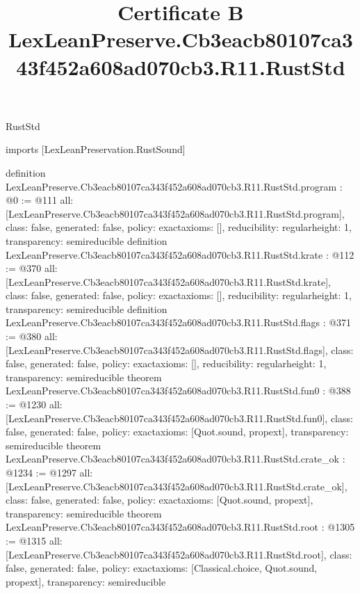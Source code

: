 \begin{lexlean}{RustStd}
\title{Certificate B LexLeanPreserve.Cb3eacb80107ca343f452a608ad070cb3.R11.RustStd}
\begin{coremodule}
imports [LexLeanPreservation.RustSound]

definition LexLeanPreserve.Cb3eacb80107ca343f452a608ad070cb3.R11.RustStd.program : @0 := @111 {
  all: [LexLeanPreserve.Cb3eacb80107ca343f452a608ad070cb3.R11.RustStd.program],
  class: false,
  generated: false,
  policy: exact{axioms: []},
  reducibility: regular{height: 1},
  transparency: semireducible
}
definition LexLeanPreserve.Cb3eacb80107ca343f452a608ad070cb3.R11.RustStd.krate : @112 := @370 {
  all: [LexLeanPreserve.Cb3eacb80107ca343f452a608ad070cb3.R11.RustStd.krate],
  class: false,
  generated: false,
  policy: exact{axioms: []},
  reducibility: regular{height: 1},
  transparency: semireducible
}
definition LexLeanPreserve.Cb3eacb80107ca343f452a608ad070cb3.R11.RustStd.flags : @371 := @380 {
  all: [LexLeanPreserve.Cb3eacb80107ca343f452a608ad070cb3.R11.RustStd.flags],
  class: false,
  generated: false,
  policy: exact{axioms: []},
  reducibility: regular{height: 1},
  transparency: semireducible
}
theorem LexLeanPreserve.Cb3eacb80107ca343f452a608ad070cb3.R11.RustStd.fun0 : @388 := @1230 {
  all: [LexLeanPreserve.Cb3eacb80107ca343f452a608ad070cb3.R11.RustStd.fun0],
  class: false,
  generated: false,
  policy: exact{axioms: [Quot.sound, propext]},
  transparency: semireducible
}
theorem LexLeanPreserve.Cb3eacb80107ca343f452a608ad070cb3.R11.RustStd.crate_ok : @1234 := @1297 {
  all: [LexLeanPreserve.Cb3eacb80107ca343f452a608ad070cb3.R11.RustStd.crate_ok],
  class: false,
  generated: false,
  policy: exact{axioms: [Quot.sound, propext]},
  transparency: semireducible
}
theorem LexLeanPreserve.Cb3eacb80107ca343f452a608ad070cb3.R11.RustStd.root : @1305 := @1315 {
  all: [LexLeanPreserve.Cb3eacb80107ca343f452a608ad070cb3.R11.RustStd.root],
  class: false,
  generated: false,
  policy: exact{axioms: [Classical.choice, Quot.sound, propext]},
  transparency: semireducible
}


\end{coremodule}
\end{lexlean}
